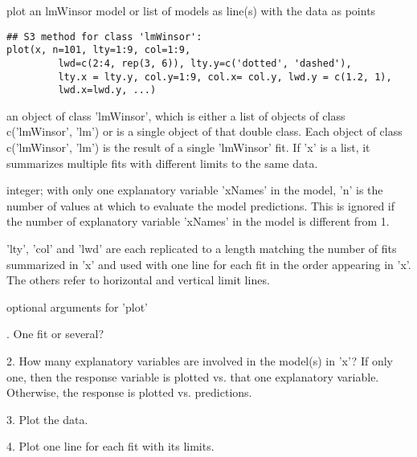 \begin{Description}\relax
plot an lmWinsor model or list of models as line(s) with the data as
points
\end{Description}
\begin{Usage}
\begin{verbatim}
## S3 method for class 'lmWinsor':
plot(x, n=101, lty=1:9, col=1:9,
         lwd=c(2:4, rep(3, 6)), lty.y=c('dotted', 'dashed'),
         lty.x = lty.y, col.y=1:9, col.x= col.y, lwd.y = c(1.2, 1),
         lwd.x=lwd.y, ...)
\end{verbatim}
\end{Usage}
\begin{Arguments}
\begin{ldescription}
\item[\code{x}] an object of class 'lmWinsor', which is either a list of objects of
class c('lmWinsor', 'lm') or is a single object of that double
class.  Each object of class c('lmWinsor', 'lm') is the result of a
single 'lmWinsor' fit.  If 'x' is a list, it summarizes multiple
fits with different limits to the same data.  

\item[\code{n}] integer;  with only one explanatory variable 'xNames' in the model,
'n' is the number of values at which to evaluate the model
predictions.  This is ignored if the number of explanatory variable
'xNames' in the model is different from 1.  

\item[\code{lty, col, lwd, lty.y, lty.x, col.y, col.x, lwd.y, lwd.x}] 'lty', 'col' and 'lwd' are each replicated to a length matching the
number of fits summarized in 'x' and used with one line for each fit
in the order appearing in 'x'.  The others refer to horizontal and
vertical limit lines. 

\item[\code{...}] optional arguments for 'plot'  

\end{ldescription}
\end{Arguments}
\begin{Details}.  One fit or several?  

2.  How many explanatory variables are involved in the model(s) in
'x'?  If only one, then the response variable is plotted vs. that one
explanatory variable.  Otherwise, the response is plotted
vs. predictions. 

3.  Plot the data.

4.  Plot one line for each fit with its limits.
\end{Details}
